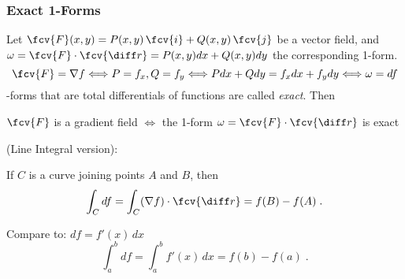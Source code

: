 \begin{frame}
\small
  \frametitle{Exact 1-Forms}

  Let $\fcv{F}(x,y) = P(x,y) \, \fcv{i} + Q(x,y)\, \fcv{j}$ be a vector field, and $\omega = \fcv{F} \cdot \fcv{\diff r} = P(x,y) dx + Q(x,y) dy$ the corresponding 1-form. \pause
%
$$\fcv{F} = \nabla f \Longleftrightarrow P=f_x, Q=f_y \Longleftrightarrow Pdx + Qdy = f_xdx+f_ydy \Longleftrightarrow \omega = df$$
%
-forms that are total differentials of functions are called \emph{exact}. Then
%
\begin{center}
  $\fcv{F}$ is a gradient field $\Longleftrightarrow$ the 1-form $\omega = \fcv{F} \cdot \fcv{\diff r}$ is exact
\end{center}

\pause
{} (Line Integral version):

If $C$ is a curve joining points $A$ and $B$, then
%
$$\int_C df = \int_C (\nabla f) \cdot \fcv{\diff r} = f(B) - f(A)\; .$$

\pause Compare to: $df = f'(x)\, dx$
%
$$\int_a^b df = \int_a^b f'(x)\, dx = f(b)-f(a)\; .$$
\end{frame}
